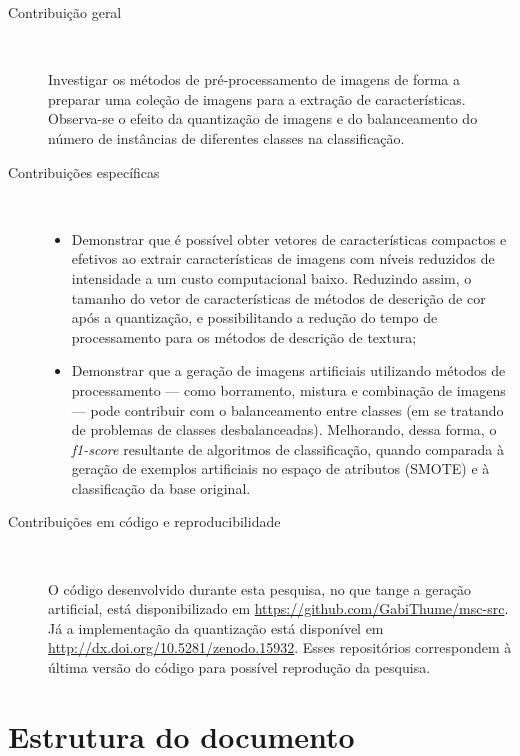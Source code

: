 \begin{description}
\item[Contribuição geral] \

Investigar os métodos de pré-processamento de imagens de forma a preparar uma coleção de imagens para a extração de características. Observa-se o efeito da quantização de imagens e do balanceamento do número de instâncias de diferentes classes na classificação.

\item[Contribuições específicas] \

  \begin{itemize}

    \item Demonstrar que é possível obter vetores de características compactos e efetivos ao extrair características de imagens com níveis reduzidos de intensidade a um custo computacional baixo. Reduzindo assim, o tamanho do vetor de características de métodos de descrição de cor após a quantização, e possibilitando a redução do tempo de processamento para os métodos de descrição de textura;

    \item Demonstrar que a geração de imagens artificiais utilizando métodos de processamento --- como borramento, mistura e combinação de imagens --- pode contribuir com o balanceamento entre classes (em se tratando de problemas de classes desbalanceadas). Melhorando, dessa forma, o \textit{f1-score} resultante de algoritmos de classificação, quando comparada à geração de exemplos artificiais no espaço de atributos (SMOTE) e à classificação da base original.

  \end{itemize}


\item[Contribuições em código e reproducibilidade] \

O código desenvolvido durante esta pesquisa, no que tange a geração artificial, está disponibilizado em \url{https://github.com/GabiThume/msc-src}. Já a implementação da quantização está disponível em \url{http://dx.doi.org/10.5281/zenodo.15932}. Esses repositórios correspondem à última versão do código para possível reprodução da pesquisa.

\end{description}

\section{Estrutura do documento}


